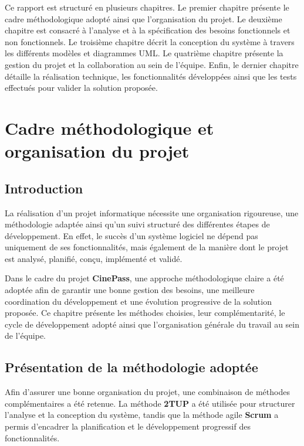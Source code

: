 \documentclass[12pt]{report}
\begin{document}
Ce rapport est structuré en plusieurs chapitres. Le premier chapitre présente le
cadre méthodologique adopté ainsi que l’organisation du projet. Le deuxième
chapitre est consacré à l’analyse et à la spécification des besoins fonctionnels
et non fonctionnels. Le troisième chapitre décrit la conception du système à
travers les différents modèles et diagrammes UML. Le quatrième chapitre présente
la gestion du projet et la collaboration au sein de l’équipe. Enfin, le dernier
chapitre détaille la réalisation technique, les fonctionnalités développées ainsi
que les tests effectués pour valider la solution proposée.
\chapter{Cadre méthodologique et organisation du projet}

\section{Introduction}

La réalisation d’un projet informatique nécessite une organisation rigoureuse,
une méthodologie adaptée ainsi qu’un suivi structuré des différentes étapes de
développement. En effet, le succès d’un système logiciel ne dépend pas
uniquement de ses fonctionnalités, mais également de la manière dont le projet
est analysé, planifié, conçu, implémenté et validé.

Dans le cadre du projet \textbf{CinePass}, une approche méthodologique claire a
été adoptée afin de garantir une bonne gestion des besoins, une meilleure
coordination du développement et une évolution progressive de la solution
proposée. Ce chapitre présente les méthodes choisies, leur complémentarité, le
cycle de développement adopté ainsi que l’organisation générale du travail au
sein de l’équipe.

\section{Présentation de la méthodologie adoptée}

Afin d’assurer une bonne organisation du projet, une combinaison de méthodes
complémentaires a été retenue. La méthode \textbf{2TUP} a été utilisée pour
structurer l’analyse et la conception du système, tandis que la méthode agile
\textbf{Scrum} a permis d’encadrer la planification et le développement
progressif des fonctionnalités.
\end{document}
